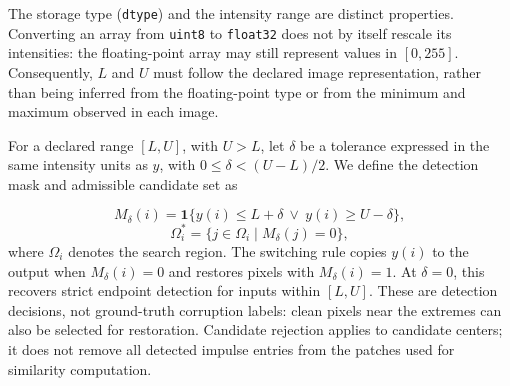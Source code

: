 \documentclass[pdflatex,iicol,sn-mathphys-num]{sn-jnl}
\newif\ifshowportuguese
\newcommand{\pt}[1]{\ifshowportuguese\par\begingroup\small\color{blue!55!black}\noindent\textbf{PT: }#1\par\endgroup\fi}
\begin{document}
The storage type (\texttt{dtype}) and the intensity range are distinct properties. Converting an array from \texttt{uint8} to \texttt{float32} does not by itself rescale its intensities: the floating-point array may still represent values in $[0,255]$. Consequently, $L$ and $U$ must follow the declared image representation, rather than being inferred from the floating-point type or from the minimum and maximum observed in each image.
\pt{O tipo de armazenamento (\texttt{dtype}) e a faixa de intensidade são propriedades distintas. Converter um array de \texttt{uint8} para \texttt{float32} não reescala, por si só, suas intensidades: o array de ponto flutuante ainda pode representar valores em $[0,255]$. Consequentemente, $L$ e $U$ devem seguir a representação declarada da imagem, em vez de serem inferidos do tipo de ponto flutuante ou do mínimo e máximo observados em cada imagem.}

For a declared range $[L,U]$, with $U>L$, let $\delta$ be a tolerance expressed in the same intensity units as $y$, with $0\leq\delta<(U-L)/2$. We define the detection mask and admissible candidate set as
\pt{Para uma faixa declarada $[L,U]$, com $U>L$, seja $\delta$ uma tolerância expressa nas mesmas unidades de intensidade de $y$, com $0\leq\delta<(U-L)/2$. Definimos a máscara de detecção e o conjunto de candidatos admissíveis como}
\begin{equation}
M_\delta(i)=\mathbf{1}\{y(i)\leq L+\delta\ \lor\ y(i)\geq U-\delta\},
\label{eq:range_impulse_mask}
\end{equation}
\begin{equation}
\Omega_i^{*}=\{j\in\Omega_i\mid M_\delta(j)=0\},
\label{eq:valid_candidates_range}
\end{equation}
where $\Omega_i$ denotes the search region. The switching rule copies $y(i)$ to the output when $M_\delta(i)=0$ and restores pixels with $M_\delta(i)=1$. At $\delta=0$, this recovers strict endpoint detection for inputs within $[L,U]$. These are detection decisions, not ground-truth corruption labels: clean pixels near the extremes can also be selected for restoration. Candidate rejection applies to candidate centers; it does not remove all detected impulse entries from the patches used for similarity computation.
\pt{em que $\Omega_i$ denota a região de busca. A regra de chaveamento copia $y(i)$ para a saída quando $M_\delta(i)=0$ e restaura pixels com $M_\delta(i)=1$. Em $\delta=0$, recupera-se a detecção estrita nos extremos para entradas em $[L,U]$. Essas são decisões de detecção, e não rótulos verdadeiros de corrupção: pixels limpos próximos dos extremos também podem ser selecionados para restauração. A rejeição de candidatos atua nos centros dos candidatos; ela não remove todas as posições detectadas como impulsos dos patches usados no cálculo de similaridade.}
\end{document}
